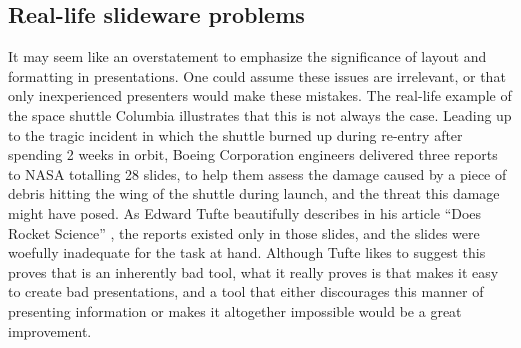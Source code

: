    \subsection{Real-life slideware problems}
    \label{nasa}

    It may seem like an overstatement to emphasize the significance of layout
    and formatting in presentations. One could assume these issues are
    irrelevant, or that only inexperienced presenters would make these mistakes.
    The real-life example of the space shuttle Columbia illustrates that this is
    not always the case. Leading up to the tragic incident in which the shuttle
    burned up during re-entry after spending 2 weeks in orbit, Boeing
    Corporation engineers delivered three reports to {NASA} totalling 28 \ppt
    slides, to help them assess the damage caused by a piece of debris hitting
    the wing of the shuttle during launch, and the threat this damage might have
    posed.  As Edward Tufte beautifully describes in his article ``\ppt Does
    Rocket Science'' \citep{tufte-2}, the reports existed only in those slides,
    and the slides were woefully inadequate for the task at hand. Although Tufte
    likes to suggest this proves that \ppt is an inherently bad tool, what it
    really proves is that \ppt makes it easy to create bad presentations, and a
    tool that either discourages this manner of presenting information or makes
    it altogether impossible would be a great improvement.

